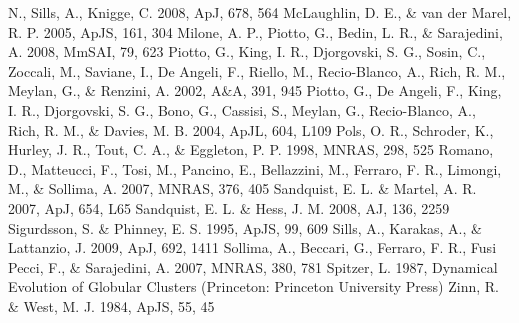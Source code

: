 \begin{thebibliography}{99}
  N., Sills, A., Knigge, C. 2008, ApJ, 678, 564
 McLaughlin, D. E., \& van der Marel,
  R. P. 2005, ApJS, 161, 304
  Milone, A. P., Piotto, G., Bedin, L. R., \& Sarajedini, A. 2008,
  MmSAI, 79, 623
  Piotto, G., King, I. R., Djorgovski, S. G., Sosin, C., Zoccali, M.,
  Saviane, I., De Angeli, F., Riello, M., Recio-Blanco, A., Rich,
  R. M., Meylan, G., \& Renzini, A. 2002, A\&A, 391, 945
  Piotto, G., De Angeli, F., King, I. R., Djorgovski, S. G., Bono, G.,
  Cassisi, S., Meylan, G., Recio-Blanco, A., Rich, R. M., \& Davies,
  M. B. 2004, ApJL, 604, L109 
 Pols,
  O. R., Schroder, K., Hurley, J. R., Tout, C. A., \& Eggleton,
  P. P. 1998, MNRAS, 298, 525
  Romano, D., Matteucci, F., Tosi, M., Pancino, E., Bellazzini, M.,
  Ferraro, F. R., Limongi, M., \& Sollima, A. 2007, MNRAS, 376, 405
 Sandquist, E. L. \& Martel,
  A. R. 2007, ApJ, 654, L65 
 Sandquist, E. L. \& Hess, J. M. 2008,
  AJ, 136, 2259 
 Sigurdsson, S. \& Phinney,
  E. S. 1995, ApJS, 99, 609 
 Sills,
  A., Karakas, A., \& Lattanzio, J. 2009, ApJ, 692, 1411
  Sollima, A., Beccari, G., Ferraro, F. R., Fusi Pecci, F., \&
  Sarajedini, A. 2007, MNRAS, 380, 781
 Spitzer,
  L. 1987, Dynamical Evolution of Globular Clusters (Princeton:
  Princeton University Press)
 Zinn, R. \& West,
  M. J. 1984, ApJS, 55, 45
\end{thebibliography}



%
